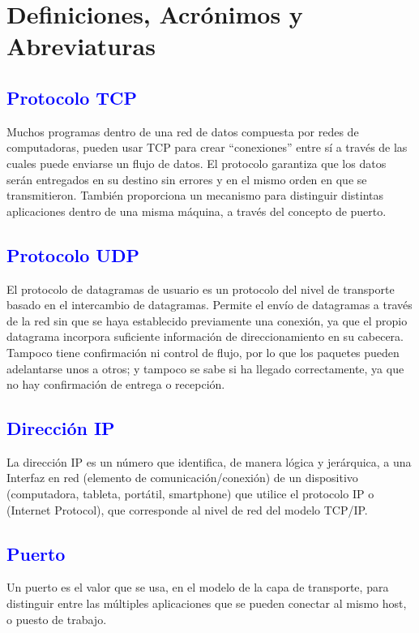 \documentclass[fontsize=12pt]{article}
\begin{document}
\section{\textbf{Definiciones, Acrónimos y Abreviaturas}}
\subsection{\textbf{\textcolor{blue}{Protocolo TCP}}}
Muchos programas dentro de una red de datos compuesta por redes de
computadoras, pueden usar TCP para crear “conexiones” entre sí a través de las
cuales puede enviarse un flujo de datos. El protocolo garantiza que los datos serán
entregados en su destino sin errores y en el mismo orden en que se transmitieron.
También proporciona un mecanismo para distinguir distintas aplicaciones dentro de
una misma máquina, a través del concepto de puerto.
\subsection{\textbf{\textcolor{blue}{Protocolo UDP}}}
El protocolo de datagramas de usuario es un protocolo del nivel de
transporte basado en el intercambio de datagramas. Permite el envío de
datagramas a través de la red sin que se haya establecido previamente una
conexión, ya que el propio datagrama incorpora suficiente información de
direccionamiento en su cabecera. Tampoco tiene confirmación ni control de flujo,
por lo que los paquetes pueden adelantarse unos a otros; y tampoco se sabe si ha
llegado correctamente, ya que no hay confirmación de entrega o recepción.
\subsection{\textbf{\textcolor{blue}{Dirección IP}}}
La dirección IP es un número que identifica, de manera lógica y jerárquica, a una Interfaz en red (elemento de comunicación/conexión)
 de un dispositivo (computadora, tableta, portátil, smartphone) que utilice el protocolo IP o (Internet Protocol), que corresponde al nivel de red del modelo TCP/IP.
\subsection{\textbf{\textcolor{blue}{Puerto}}}
Un puerto es el valor que se usa, en el modelo de la capa de transporte, para
distinguir entre las múltiples aplicaciones que se pueden conectar al mismo host, o
puesto de trabajo.
\end{document}

